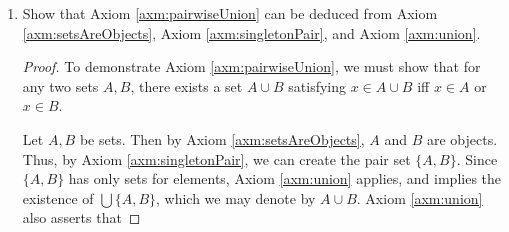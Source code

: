 \documentclass[../main.tex]{subfiles}
\begin{document}
\begin{enumerate}[ref={\thesection.\arabic*}]
\begin{proof}
\begin{enumerate}[label={(\arabic*)}]
            \begin{equation*}
                A_{X'} := \{Y'^{X'}:Y'\in 2^Y\}
            \end{equation*}
            \item Let $2^X$ be an index set. Then by (2), for every $X'\in 2^X$, we have some set $A_{X'}$. Thus, by Equation \ref{eqn:union}, we can form the union set $\bigcup_{X'\in 2^X}A_{X'}$ by defining $\bigcup_{X'\in 2^X}A_{X'}:=\bigcup\{A_{X'}:X'\in 2^X\}$. If we inspect this definition, we see that this set is the set of all elements in every possible $A_{X'}$ (i.e., every $A_{X'}$ such that $X'\in 2^X$). Since every element of any $A_{X'}$ is a set of the type $Y'^{X'}$, the above union is really just the set of all $Y'^{X'}$ for any $X'\in 2^X$ and any $Y'\in 2^Y$. In sum, we have defined the set
            \begin{equation*}
                \bigcup_{X'\in 2^X}A_{X'} := \{Y'^{X'}:X'\in 2^X;Y'\in 2^Y\}
            \end{equation*}
            \item By Axiom \ref{axm:powerSets}, every $Y'^{X'}$ is a set. Thus, the set defined in (3) is a set whose elements are all themselves sets. Therefore, Axiom \ref{axm:union} applies, and we can create the set $\bigcup \left( \bigcup_{X'\in 2^X}A_{X'} \right)$, whose elements are precisely those objects which are elements of the elements of $\bigcup_{X'\in 2^X}A_{X'}$; in other words, whose elements are every partial function in every $Y'^{X'}$, i.e., all partial functions from $X$ to $Y$.
        \end{enumerate}
    \end{proof}
    \item \label{exr:3.4.8}Show that Axiom \ref{axm:pairwiseUnion} can be deduced from Axiom \ref{axm:setsAreObjects}, Axiom \ref{axm:singletonPair}, and Axiom \ref{axm:union}.
    \begin{proof}
        To demonstrate Axiom \ref{axm:pairwiseUnion}, we must show that for any two sets $A,B$, there exists a set $A\cup B$ satisfying $x\in A\cup B$ iff $x\in A$ or $x\in B$.\par
        Let $A,B$ be sets. Then by Axiom \ref{axm:setsAreObjects}, $A$ and $B$ are objects. Thus, by Axiom \ref{axm:singletonPair}, we can create the pair set $\{A,B\}$. Since $\{A,B\}$ has only sets for elements, Axiom \ref{axm:union} applies, and implies the existence of $\bigcup\{A,B\}$, which we may denote by $A\cup B$. Axiom \ref{axm:union} also asserts that

\end{proof}
\end{enumerate}
\end{document}
